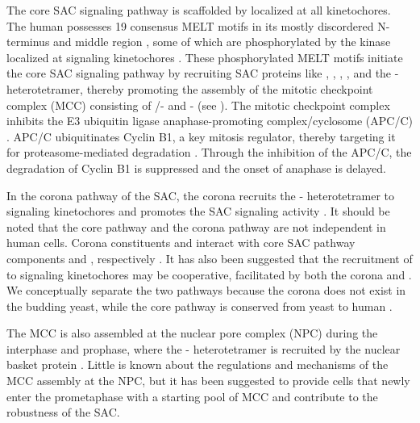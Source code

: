 The core SAC signaling pathway is scaffolded by  localized at all kinetochores. The human  possesses 19 consensus MELT motifs in its mostly discordered N-terminus and middle region \cite{MELTEvolution}, some of which are phosphorylated by the kinase  localized at signaling kinetochores \cite{MPS1-KNL1_London2012, MPS1-KNL1_Shepperd2012, MPS1-KNL1_Yamagishi2012, MPS1Localization_Ji, MPS1Localization_Hiruma}. These phosphorylated MELT motifs initiate the core SAC signaling pathway by recruiting SAC proteins like , , , , and the - heterotetramer, thereby promoting the assembly of the mitotic checkpoint complex (MCC) consisting of /- and - \cite{RecombinantKNL1, MELTActivity, BubBiochem, BubR1TwoPools, BUB1CD1-MAD1CStructure, Faesen2017, BUB1-CDC20-MAD1, Tripartite, SpMCC} (see ). The mitotic checkpoint complex inhibits the E3 ubiquitin ligase anaphase-promoting complex/cyclosome (APC/C) \cite{APC-MCC_Alfieri2016, APC-MCC_Yamaguchi2016}. APC/C ubiquitinates Cyclin B1, a key mitosis regulator, thereby targeting it for proteasome-mediated degradation \cite{CyclinB1Degradation_Clute+Pines1999, CyclinB1Degradation_Chang2003, SeparaseStructure}. Through the inhibition of the APC/C, the degradation of Cyclin B1 is suppressed and the onset of anaphase is delayed.

In the corona pathway of the SAC, the corona recruits the - heterotetramer to signaling kinetochores and promotes the SAC signaling activity \cite{CoronaActivatesSAC}. It should be noted that the core pathway and the corona pathway are not independent in human cells. Corona constituents  and  interact with core SAC pathway components  and , respectively \cite{CENPELocalization-BUBR1, CENP-FLimitsStripping}. It has also been suggested that the recruitment of  to signaling kinetochores may be cooperative, facilitated by both the corona and  \cite{MIS12-CEP57-MAD1-MAD2, siROD_Zhang2019}. We conceptually separate the two pathways because the corona does not exist in the budding yeast, while the core pathway is conserved from yeast to human \cite{YeastNoRZZ}.

The MCC is also assembled at the nuclear pore complex (NPC) during the interphase and prophase, where the - heterotetramer is recruited by the nuclear basket protein  \cite{TPR-MAD1_Lee2008, PremitoticMCC}. Little is known about the regulations and mechanisms of the MCC assembly at the NPC, but it has been suggested to provide cells that newly enter the prometaphase with a starting pool of MCC and contribute to the robustness of the SAC.

